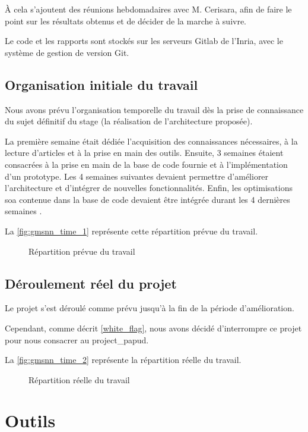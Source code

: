 À cela s'ajoutent des réunions hebdomadaires avec M. Cerisara, afin de faire le point sur les résultats obtenus et de décider de la marche à suivre.

Le code et les rapports sont stockés sur les serveurs Gitlab de l'Inria, avec le système de gestion de version Git.

\subsection{Organisation initiale du travail}
Nous avons prévu l'organisation temporelle du travail dès la prise de connaissance du sujet définitif du stage (la réalisation de l'architecture proposée).

La première semaine était dédiée l'acquisition des connaissances nécessaires, à la lecture d'articles et à la prise en main des outils.
Ensuite, 3 semaines étaient consacrées à la prise en main de la base de code fournie et à l'implémentation d'un prototype.
Les 4 semaines suivantes devaient permettre d'améliorer l'architecture et d'intégrer de nouvelles fonctionnalités.
Enfin, les optimisations \gls{soa} contenue dans la base de code devaient être intégrée durant les 4 dernières semaines .

La \autoref{fig:gmsnn_time_1} représente cette répartition prévue du travail.

\begin{figure}[ht]
	\centering
	\caption{Répartition prévue du travail}\label{fig:gmsnn_time_1}
\end{figure}

\subsection{Déroulement réel du projet}
Le projet s'est déroulé comme prévu jusqu'à la fin de la période d'amélioration.

Cependant, comme décrit \autoref{white_flag}, nous avons décidé d'interrompre ce projet pour nous consacrer au \gls{project_papud}.

La \autoref{fig:gmsnn_time_2} représente la répartition réelle du travail.

\begin{figure}[ht]
	\centering
	\caption{Répartition réelle du travail}\label{fig:gmsnn_time_2}
\end{figure}

\section{Outils}
